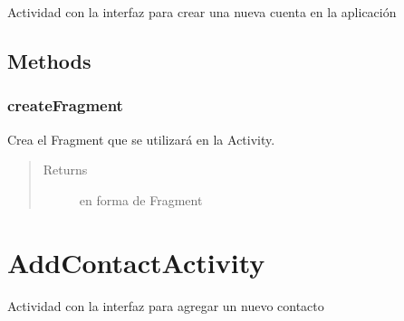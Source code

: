 \documentclass[letterpaper,10pt,english]{sphinxmanual}
\begin{document}
\begin{fulllineitems}
\label{Activities/SignUpActivity:com.fiuba.tallerii.jobify.SignUpActivity}
Actividad con la interfaz para crear una nueva cuenta en la aplicación

\end{fulllineitems}



\subsection{Methods}
\label{Activities/SignUpActivity:methods}

\subsubsection{createFragment}
\label{Activities/SignUpActivity:createfragment}

\begin{fulllineitems}
\label{Activities/SignUpActivity:com.fiuba.tallerii.jobify.SignUpActivity.createFragment()}
Crea el Fragment que se utilizará en la Activity.
\begin{quote}\begin{description}
\item[{Returns}] \leavevmode
{} en forma de Fragment

\end{description}\end{quote}

\end{fulllineitems}



\section{AddContactActivity}
\label{Activities/AddContactActivity::doc}\label{Activities/AddContactActivity:addcontactactivity}

\begin{fulllineitems}
\label{Activities/AddContactActivity:com.fiuba.tallerii.jobify.AddContactActivity}
Actividad con la interfaz para agregar un nuevo contacto

\end{fulllineitems}
\end{document}
